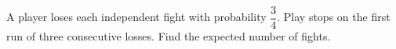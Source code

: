 A player loses each independent fight with probability $\dfrac{3}{4}$. Play stops on the first run of three consecutive losses. Find the expected number of fights.
